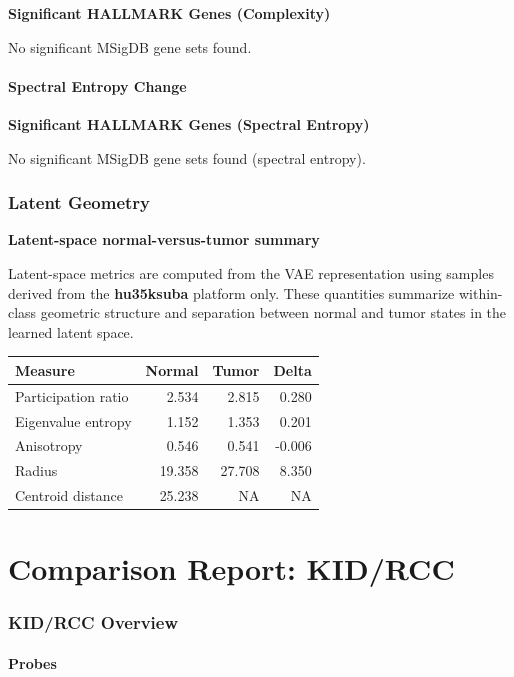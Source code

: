 \documentclass[
  letterpaper,
  DIV=11,
  numbers=noendperiod,
  openany,
  oneside]{scrreprt}
\begin{document}
\textbf{Significant HALLMARK Genes (Complexity)}

No significant MSigDB gene sets found.

\subsubsection{Spectral Entropy Change}

\textbf{Significant HALLMARK Genes (Spectral Entropy)}

No significant MSigDB gene sets found (spectral entropy).

\subsection{Latent Geometry}

\textbf{Latent-space normal-versus-tumor summary}

Latent-space metrics are computed from the VAE representation using
samples derived from the \textbf{hu35ksuba} platform only. These
quantities summarize within-class geometric structure and separation
between normal and tumor states in the learned latent space.

\begin{longtable}[]{@{}lrrr@{}}
\toprule\noalign{}
Measure & Normal & Tumor & Delta \\
\midrule\noalign{}
\endhead
\bottomrule\noalign{}
\endlastfoot
Participation ratio & 2.534 & 2.815 & 0.280 \\
Eigenvalue entropy & 1.152 & 1.353 & 0.201 \\
Anisotropy & 0.546 & 0.541 & -0.006 \\
Radius & 19.358 & 27.708 & 8.350 \\
Centroid distance & 25.238 & NA & NA \\
\end{longtable}

\chapter{Comparison Report: KID/RCC}\label{comparison-report-kidrcc}

\subsection{KID/RCC Overview}

\subsubsection{Probes}
\end{document}
